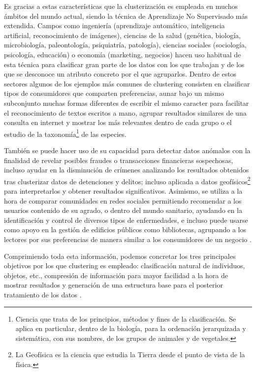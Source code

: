 \documentclass[10pt, a4paper]{article}
\begin{document}
Es gracias a estas características que la clusterización es empleada en muchos ámbitos del mundo actual, siendo la técnica de Aprendizaje No Supervisado más extendida. Campos como ingeniería (aprendizaje automático, inteligencia artificial, reconocimiento de imágenes), ciencias de la salud (genética, biología, microbiología, paleontología, psiquiatría, patología), ciencias sociales (sociología, psicología, educación) o economía (marketing, negocios) \cite{survey} hacen uso habitual de esta técnica para clasificar gran parte de los datos con los que trabajan y de los que se desconoce un atributo concreto por el que agruparlos. Dentro de estos sectores algunos de los ejemplos más comunes de clustering consisten en clasificar tipos de consumidores que comparten preferencias, aunar bajo un mismo subconjunto muchas formas diferentes de escribir el mismo caracter para facilitar el reconocimiento de textos escritos a mano, agrupar resultados similares de una consulta en internet y mostrar los más relevantes dentro de cada grupo o el estudio de la taxonomía\footnote{Ciencia que trata de los principios, métodos y fines de la clasificación. Se aplica en particular, dentro de la biología, para la ordenación jerarquizada y sistemática, con sus nombres, de los grupos de animales y de vegetales.} de las especies. 

También se puede hacer uso de su capacidad para detectar datos anómalos con la finalidad de revelar posibles fraudes o transacciones  financieras sospechosas, incluso ayudar en la disminución de crímenes analizando los resultados obtenidos tras clusterizar datos de detenciones y delitos; incluso aplicada a datos geofísicos\footnote{La Geofísica es la ciencia que estudia la Tierra desde el punto de vista de la física.} para interpretarlos y obtener resultados significativos. Asimismo, se utiliza a la hora de comparar comunidades en redes sociales permitiendo recomendar a los usuarios contenido de su agrado, o dentro del mundo sanitario, ayudando en la identificación y control de diversos tipos de enfermedades, e incluso puede usarse como apoyo en la gestión de edificios públicos como bibliotecas, agrupando a los lectores por sus preferencias de manera similar a los consumidores de un negocio \cite{9,10,11,12,13}.

Comprimiendo toda esta información, podemos concretar los tres principales objetivos por los que clustering es empleado: clasificación natural de individuos, objetos, etc., compresión de información para mayor facilidad a la hora de mostrar resultados y generación de una estructura base para el posterior tratamiento de los datos \cite{articulo14}.
\end{document}

